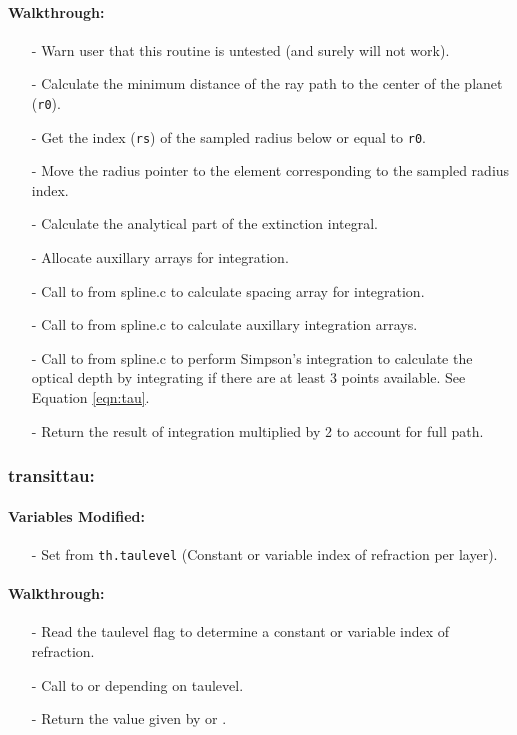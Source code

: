 \documentclass[letterpaper,12pt]{article}
\begin{document}
\paragraph{Walkthrough:}
\begin{enumerate}[leftmargin=10pt, noitemsep, parsep=0pt, topsep=0ex]
\item[-] Warn user that this routine is untested (and surely will not work).
\item[-] Calculate the minimum distance of the ray path to the center
  of the planet ({\tt r0}).
\item[-] Get the index ({\tt rs}) of the sampled radius below or equal
  to {\tt r0}.
\item[-] Move the radius pointer to the element corresponding to the
  sampled radius index.
\item[-] Calculate the analytical part of the extinction integral.
\item[-] Allocate auxillary arrays for integration.
\item[-] Call to  from spline.c to calculate spacing array for integration.
\item[-] Call to  from spline.c to calculate auxillary integration arrays.
\item[-] Call to  from spline.c to perform Simpson's integration to calculate the optical depth by integrating if
  there are at least 3 points available. See Equation \ref{eqn:tau}.
\item[-] Return the result of integration multiplied by 2 to account for full path.
\end{enumerate}


\subsubsection{transittau:}
\paragraph{Variables Modified:}
\begin{enumerate}[leftmargin=10pt, noitemsep, parsep=0pt, topsep=0ex]
\item[-] Set  from {\tt th.taulevel} (Constant or
  variable index of refraction per layer).
\end{enumerate}

\paragraph{Walkthrough:}
\begin{enumerate}[leftmargin=10pt, noitemsep, parsep=0pt, topsep=0ex]
\item[-] Read the taulevel flag to determine a constant or variable
  index of refraction.
\item[-] Call to  or  depending on
  taulevel.
\item[-] Return the value given by  or .
\end{enumerate}
\end{document}
